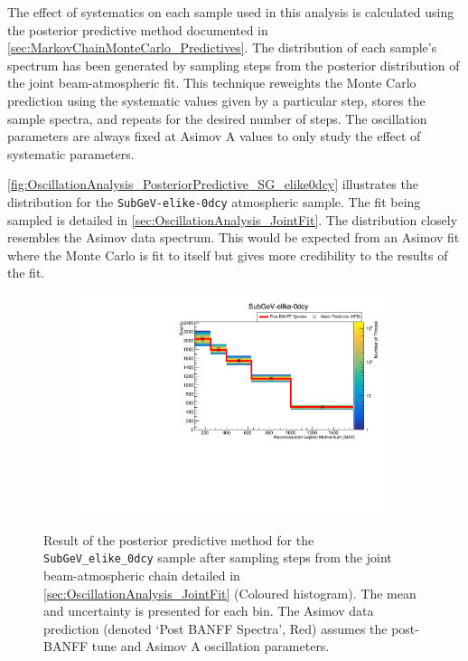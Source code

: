 The effect of systematics on each sample used in this analysis is calculated using the posterior predictive method documented in \autoref{sec:MarkovChainMonteCarlo_Predictives}. The distribution of each sample's spectrum has been generated by sampling  steps from the posterior distribution of the joint beam-atmospheric fit. This technique reweights the Monte Carlo prediction using the systematic values given by a particular step, stores the sample spectra, and repeats for the desired number of steps. The oscillation parameters are always fixed at Asimov A values to only study the effect of systematic parameters.

\autoref{fig:OscillationAnalysis_PosteriorPredictive_SG_elike0dcy} illustrates the distribution for the \texttt{SubGeV-elike-0dcy} atmospheric sample. The fit being sampled is detailed in \autoref{sec:OscillationAnalysis_JointFit}. The distribution closely resembles the Asimov data spectrum. This would be expected from an Asimov fit where the Monte Carlo is fit to itself but gives more credibility to the results of the fit.

\begin{figure}[h]
  \begin{subfigure}[t]{0.98\textwidth}
    \includegraphics[width=\textwidth, trim={0mm 0mm 0mm 0mm}, clip,page=1]{Figures/OA/Predictive_AllSyst.pdf}
  \end{subfigure}
  \caption{Result of the posterior predictive method for the \texttt{SubGeV\_elike\_0dcy} sample after sampling  steps from the joint beam-atmospheric chain detailed in \autoref{sec:OscillationAnalysis_JointFit} (Coloured histogram). The mean and uncertainty is presented for each bin. The Asimov data prediction (denoted `Post BANFF Spectra', Red) assumes the post-BANFF tune and Asimov A oscillation parameters.}
  \label{fig:OscillationAnalysis_PosteriorPredictive_SG_elike0dcy}
\end{figure}

